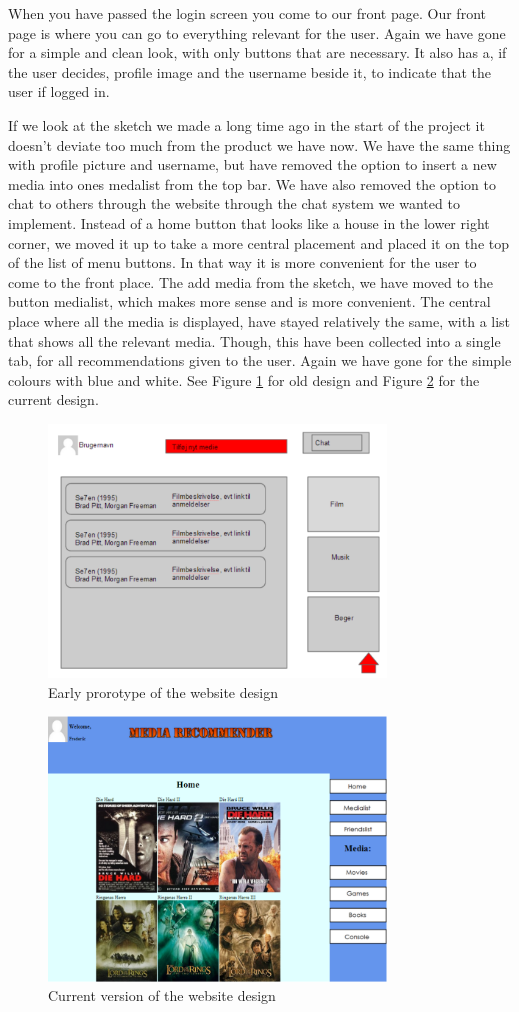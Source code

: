 When you have passed the login screen you come to our front page. Our front page is where you can go to everything relevant for the user. Again we have gone for a simple and clean look, with only buttons that are necessary. It also has a, if the user decides, profile image and the username beside it, to indicate that the user if logged in.

If we look at the sketch we made a long time ago in the start of the project it doesn’t deviate too much from the product we have now. We have the same thing with profile picture and username, but have removed the option to insert a new media into ones medalist from the top bar. We have also removed the option to chat to others through the website through the chat system we wanted to implement.
Instead of a home button that looks like a house in the lower right corner, we moved it up to take a more central placement and placed it on the top of the list of menu buttons. In that way it is more convenient for the user to come to the front place. The add media from the sketch, we have moved to the button medialist, which makes more sense and is more convenient. The central place where all the media is displayed, have stayed relatively the same, with a list that shows all the relevant media. Though, this have been collected into a single tab, for all recommendations given to the user. Again we have gone for the simple colours with blue and white. See Figure \ref{OldSite} for old design and Figure \ref{CurrSite} for the current design.

\begin{figure}[htb]
\centering
\includegraphics[width=0.8\textwidth]{Images/OldSite.png}
\caption{Early prorotype of the website design}
\label{OldSite}
\end{figure}


\begin{figure}[htb]
\centering
\includegraphics[width=0.8\textwidth]{Images/CurrSite.png}
\caption{Current version of the website design}
\label{CurrSite}
\end{figure}
